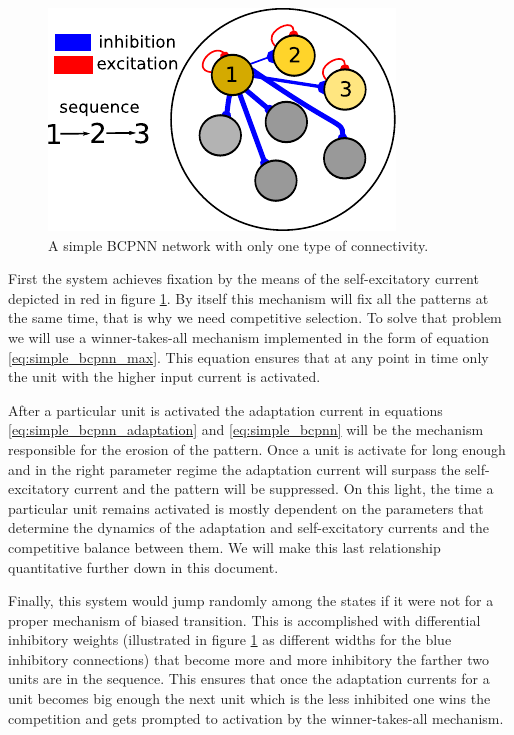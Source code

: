 \documentclass[10pt,a4paper]{article}
\begin{document}
\begin{figure}[H]
\centering
\includegraphics[scale=1.40]{simple_BCPNN.pdf}
\caption{A simple BCPNN network with only one type of connectivity.}
\label{fig:bcpnn_simple_network}
\end{figure}

First the system achieves fixation by the means of the self-excitatory current depicted in red in figure \ref{fig:bcpnn_simple_network}. By itself this mechanism will fix all the patterns at the same time, that is why we need competitive selection.  To solve that problem we will use a winner-takes-all mechanism \cite{yuille1998winner} implemented in the form of equation \ref{eq:simple_bcpnn_max}. This equation ensures that at any point in time only the unit with the higher input current is activated. 


After a particular unit is activated the adaptation current in equations \ref{eq:simple_bcpnn_adaptation} and \ref{eq:simple_bcpnn}  will be the mechanism responsible for the erosion of the pattern. Once a unit is activate for long enough and in the right parameter regime the adaptation current will surpass the self-excitatory current and the pattern will be suppressed. On this light, the time a particular unit remains activated is mostly dependent on the parameters that determine the dynamics of the adaptation and self-excitatory currents and the competitive balance between them. We will make this last relationship quantitative further down in this document. 

Finally, this system would jump randomly among the states if it were not for a proper mechanism of biased transition. This is accomplished with differential inhibitory weights (illustrated in figure \ref{fig:bcpnn_simple_network} as different widths for the blue inhibitory connections) that become more and more inhibitory the farther two units are in the sequence. This ensures that once the adaptation currents for a unit becomes big enough the next unit which is the less inhibited one wins the competition and gets prompted to activation by the winner-takes-all mechanism.  
\end{document}
